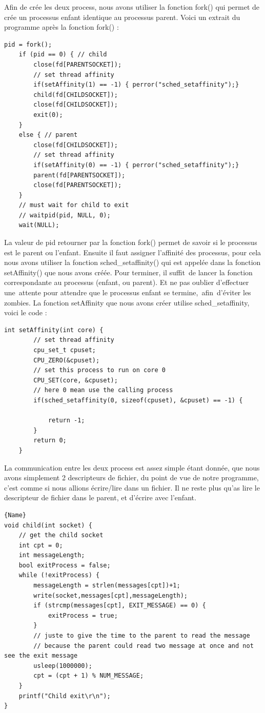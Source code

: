 \documentclass[
	a4paper, %
	10pt, %
]{CSUniSchoolLabReport}
\begin{document}
Afin de crée les deux process, nous avons utiliser la fonction fork() qui permet de crée un processus enfant identique au processus parent.
Voici un extrait du programme apr\`es la fonction fork() :
\begin{lstlisting}[style=CStyle, firstnumber=1]
	pid = fork();
    if (pid == 0) { // child 
        close(fd[PARENTSOCKET]); 
        // set thread affinity
        if(setAffinity(1) == -1) { perror("sched_setaffinity");}
        child(fd[CHILDSOCKET]);
        close(fd[CHILDSOCKET]);
        exit(0);
    }
    else { // parent 
        close(fd[CHILDSOCKET]);
        // set thread affinity
        if(setAffinity(0) == -1) { perror("sched_setaffinity");}
        parent(fd[PARENTSOCKET]);
        close(fd[PARENTSOCKET]);
    }
    // must wait for child to exit
    // waitpid(pid, NULL, 0);
    wait(NULL);
\end{lstlisting}
La valeur de pid retourner par la fonction fork() permet de savoir si le processus est le parent ou l'enfant.
Ensuite il faut assigner l'affinité des processus, pour cela nous avons utiliser la fonction sched\_setaffinity() qui est appelée dans la fonction setAffinity() que nous avons cré\'ee.
Pour terminer, il suffit\ de lancer la fonction correspondante au processus (enfant, ou parent).
Et ne pas oublier d'effectuer une\ attente pour attendre que le processus enfant se termine,\ afin\ d'\'eviter les zombies.
La fonction setAffinity que nous avons créer utilise sched\_setaffinity, voici le code : \\
\begin{lstlisting}[style=CStyle, firstnumber=1]
	int setAffinity(int core) {
		// set thread affinity
		cpu_set_t cpuset;
		CPU_ZERO(&cpuset);
		// set this process to run on core 0
		CPU_SET(core, &cpuset);
		// here 0 mean use the calling process
		if(sched_setaffinity(0, sizeof(cpuset), &cpuset) == -1) {
	
			return -1;
		}
		return 0;
	}
\end{lstlisting}
La communication entre les deux process est assez simple \'etant donnée, que nous avons simplement 2 descripteurs de fichier, du point de vue de notre programme, c'est comme si nous allions écrire/lire dans un fichier.
Il ne reste plus qu'as lire le descripteur de fichier dans le parent, et d'écrire avec l'enfant.\\
\noindent\begin{minipage}{.50\textwidth}
\begin{lstlisting}[style=CStyle, caption=Processus Enfant, firstnumber=1]{Name}
void child(int socket) {
	// get the child socket
	int cpt = 0;
	int messageLength;
	bool exitProcess = false;
	while (!exitProcess) {
		messageLength = strlen(messages[cpt])+1;
		write(socket,messages[cpt],messageLength);
		if (strcmp(messages[cpt], EXIT_MESSAGE) == 0) {
			exitProcess = true;
		}
		// juste to give the time to the parent to read the message
		// because the parent could read two message at once and not see the exit message
		usleep(1000000); 
		cpt = (cpt + 1) % NUM_MESSAGE;
	}
	printf("Child exit\r\n");
}
\end{lstlisting}
\end{minipage}\hfill
\end{document}
